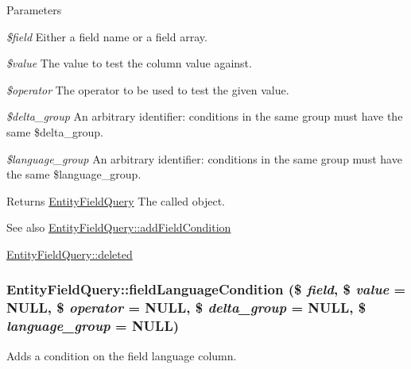 \begin{DoxyParams}{Parameters}
\item[{\em \$field}]Either a field name or a field array. \item[{\em \$value}]The value to test the column value against. \item[{\em \$operator}]The operator to be used to test the given value. \item[{\em \$delta\_\-group}]An arbitrary identifier: conditions in the same group must have the same \$delta\_\-group. \item[{\em \$language\_\-group}]An arbitrary identifier: conditions in the same group must have the same \$language\_\-group.\end{DoxyParams}
\begin{DoxyReturn}{Returns}
\hyperlink{classEntityFieldQuery}{EntityFieldQuery} The called object.
\end{DoxyReturn}
\begin{DoxySeeAlso}{See also}
\hyperlink{classEntityFieldQuery_addc28605e17a54c0198f3cd6e2753489}{EntityFieldQuery::addFieldCondition} 

\hyperlink{classEntityFieldQuery_a49543cc7ea0841ba46d4ebe310695ce3}{EntityFieldQuery::deleted} 
\end{DoxySeeAlso}
\hypertarget{classEntityFieldQuery_a4c09c59b7bea2f57e8c8b50ef641fbf4}{
\subsubsection[{fieldLanguageCondition}]{\setlength{\rightskip}{0pt plus 5cm}EntityFieldQuery::fieldLanguageCondition (\$ {\em field}, \/  \$ {\em value} = {\ttfamily NULL}, \/  \$ {\em operator} = {\ttfamily NULL}, \/  \$ {\em delta\_\-group} = {\ttfamily NULL}, \/  \$ {\em language\_\-group} = {\ttfamily NULL})}}
\label{classEntityFieldQuery_a4c09c59b7bea2f57e8c8b50ef641fbf4}
Adds a condition on the field language column.


